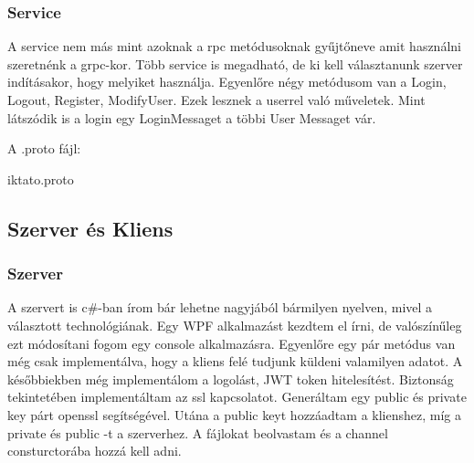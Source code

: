 \documentclass[conference]{IEEEtran}
\begin{document}
\subsubsection{Service}

A service nem más mint azoknak a rpc metódusoknak gyűjtőneve amit használni szeretnénk a grpc-kor. Több service is megadható, de ki kell választanunk szerver indításakor, hogy melyiket használja. Egyenlőre négy metódusom van a Login, Logout, Register, ModifyUser. Ezek lesznek a userrel való műveletek. Mint látszódik is a login egy LoginMessaget a többi User Messaget vár.

A .proto fájl:
\begin{lstinputlisting}{iktato.proto}
	
\end{lstinputlisting}
\subsection{\textbf{Szerver és Kliens}}

\subsubsection{Szerver}

A szervert is c\#-ban írom bár lehetne nagyjából bármilyen nyelven, mivel a választott technológiának. Egy WPF alkalmazást kezdtem el írni, de valószínűleg ezt módosítani fogom egy console alkalmazásra. Egyenlőre egy pár metódus van még csak implementálva, hogy a kliens felé tudjunk küldeni valamilyen adatot. A későbbiekben még implementálom a logolást, JWT token hitelesítést. Biztonság tekintetében implementáltam az ssl kapcsolatot. Generáltam egy public és private key párt openssl segítségével. Utána a public keyt hozzáadtam a klienshez, míg a private és public -t a szerverhez. A fájlokat beolvastam és a channel consturctorába hozzá kell adni.\cite{b4} 
\end{document}
